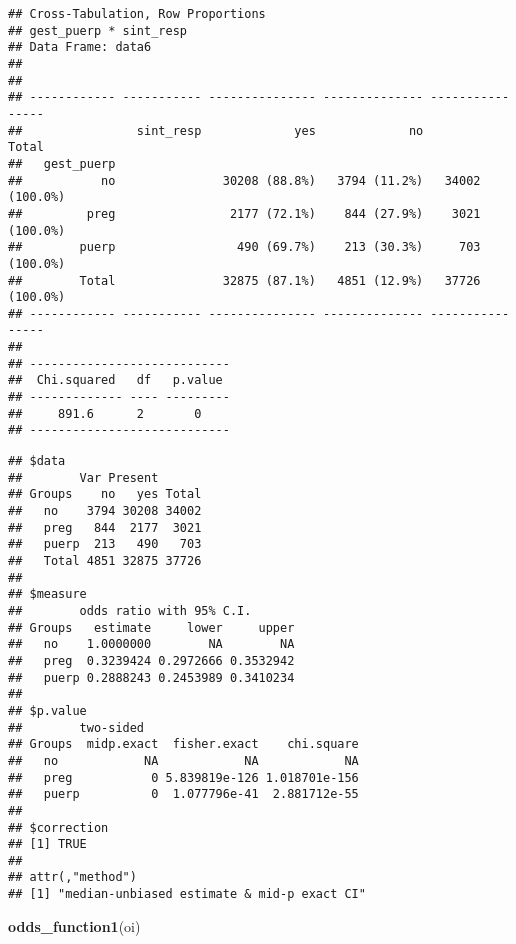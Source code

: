 \documentclass[
]{article}
\newenvironment{Shaded}{\begin{snugshade}}{\end{snugshade}}
\newcommand{\KeywordTok}[1]{\textcolor[rgb]{0.13,0.29,0.53}{\textbf{#1}}}
\newcommand{\NormalTok}[1]{#1}
\newcommand{\OperatorTok}[1]{\textcolor[rgb]{0.81,0.36,0.00}{\textbf{#1}}}
\newcommand{\StringTok}[1]{\textcolor[rgb]{0.31,0.60,0.02}{#1}}
\begin{document}
\begin{verbatim}
## Cross-Tabulation, Row Proportions  
## gest_puerp * sint_resp  
## Data Frame: data6  
## 
## 
## ------------ ----------- --------------- -------------- ----------------
##                sint_resp             yes             no            Total
##   gest_puerp                                                            
##           no               30208 (88.8%)   3794 (11.2%)   34002 (100.0%)
##         preg                2177 (72.1%)    844 (27.9%)    3021 (100.0%)
##        puerp                 490 (69.7%)    213 (30.3%)     703 (100.0%)
##        Total               32875 (87.1%)   4851 (12.9%)   37726 (100.0%)
## ------------ ----------- --------------- -------------- ----------------
## 
## ----------------------------
##  Chi.squared   df   p.value 
## ------------- ---- ---------
##     891.6      2       0    
## ----------------------------
\end{verbatim}

\begin{Shaded}
\end{Shaded}

\begin{verbatim}
## $data
##        Var Present
## Groups    no   yes Total
##   no    3794 30208 34002
##   preg   844  2177  3021
##   puerp  213   490   703
##   Total 4851 32875 37726
## 
## $measure
##        odds ratio with 95% C.I.
## Groups   estimate     lower     upper
##   no    1.0000000        NA        NA
##   preg  0.3239424 0.2972666 0.3532942
##   puerp 0.2888243 0.2453989 0.3410234
## 
## $p.value
##        two-sided
## Groups  midp.exact  fisher.exact    chi.square
##   no            NA            NA            NA
##   preg           0 5.839819e-126 1.018701e-156
##   puerp          0  1.077796e-41  2.881712e-55
## 
## $correction
## [1] TRUE
## 
## attr(,"method")
## [1] "median-unbiased estimate & mid-p exact CI"
\end{verbatim}

\begin{Shaded}
\begin{Highlighting}[]
\KeywordTok{odds_function1}\NormalTok{(oi)}
\end{Highlighting}
\end{Shaded}
\end{document}
